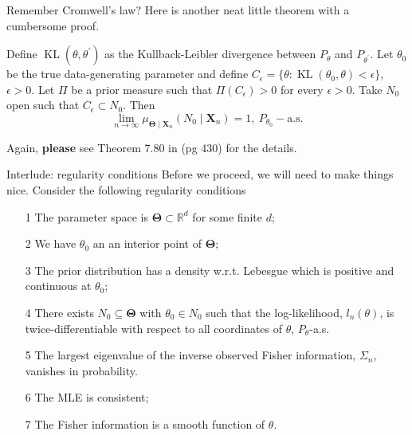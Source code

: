 \begin{frame}{Remember Cromwell's law?}
Here is another neat little theorem with a cumbersome proof.
\begin{theo}
Define $\operatorname{KL}(\theta, \theta^\prime)$ as the Kullback-Leibler divergence between $P_{\theta}$ and $P_{\theta^\prime}$.
Let $\theta_0$ be the true data-generating parameter and define $C_\epsilon = \{\theta : \operatorname{KL}(\theta_0, \theta) < \epsilon\}$, $\epsilon > 0$.
 Let $\Pi$ be a prior measure such that $\Pi(C_\epsilon) > 0$ for every $\epsilon > 0$.
 Take $N_0$ open such that $C_\epsilon \subset N_0$.
 Then 
 \begin{equation*}
  \lim_{n \to \infty} \mu_{\boldsymbol{\Theta} \mid \boldsymbol{X}_{n}}(N_0 \mid \boldsymbol{X}_{n}) = 1, \: P_{\theta_0}-\textrm{a.s.}
 \end{equation*}
\end{theo}
Again, \textbf{please} see Theorem 7.80 in \cite{Schervish1995} (pg 430) for the details.
\end{frame}
\begin{frame}[allowframebreaks]{Interlude: regularity conditions}
Before we proceed, we will need to make things nice.
Consider the following regularity conditions
\begin{itemize}
 \item[1] The parameter space is $\boldsymbol{\Theta} \subset \mathbb{R}^d$ for some finite $d$;
 \item[2] We have $\theta_0$ an an interior point of $\boldsymbol{\Theta}$;
 \item[3] The prior distribution has a density w.r.t. Lebesgue which is positive and continuous at $\theta_0$;
 \item[4] There exists $N_0 \subseteq \boldsymbol{\Theta}$ with $\theta_0 \in N_0$ such that the log-likelihood, $l_n(\theta)$, is twice-differentiable with respect to all coordinates of $\theta$, $P_{\theta}$-a.s.
 \item[5] The largest eigenvalue of the inverse observed Fisher information, $\Sigma_n$, vanishes in probability.
 \item[6] The MLE is consistent;
 \item[7] The Fisher information is a smooth function of $\theta$.
\end{itemize}

\end{frame}
